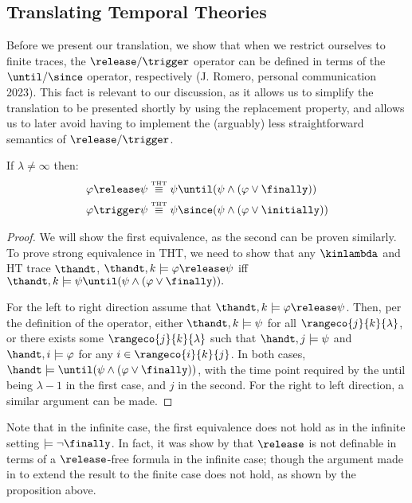 \subsection{Translating Temporal Theories}

Before we present our translation, we show that when we restrict
ourselves to finite traces, the $\release/\trigger$ operator can be
defined in terms of the $\until/\since$ operator, respectively
(J. Romero, personal communication 2023). This fact is relevant to our
discussion, as it allows us to simplify the translation to be
presented shortly by using the replacement property, and allows us to
later avoid having to implement the (arguably) less straightforward
semantics of $\release/\trigger$.

\begin{proposition}

If $\lambda \neq \infty$ then:
\begin{align*}
\varphi \release \psi &\equivtht \psi \until (\psi \wedge (\varphi \vee \finally)) \\
\varphi \trigger \psi &\equivtht \psi \since (\psi \wedge (\varphi \vee \initially))
\end{align*}
\end{proposition}
\begin{proof}
  We will show the first equivalence, as the second can be proven
  similarly. To prove strong equivalence in THT, we need to show that
  any $\kinlambda$ and HT trace $\thandt$,
  $\thandt,k \models \varphi \release \psi$ iff
  $\thandt,k \models \psi \until (\psi \wedge (\varphi \vee
  \finally)).$

  For the left to right direction assume that
  $\thandt,k \models \varphi \release \psi$. Then, per the definition
  of the operator, either $\thandt,k \models \psi$ for all
  $\rangeco{j}{k}{\lambda}$, or there exists some
  $\rangeco{j}{k}{\lambda}$ such that $\handt,j \models \psi$ and
  $\handt,i \models \varphi$ for any $i \in \rangeco{i}{k}{j}$. In
  both cases,
  $\handt \models \until (\psi \wedge (\varphi \vee \finally))$, with
  the time point required by the until being $\lambda-1$ in the first
  case, and $j$ in the second. For the right to left direction, a
  similar argument can be made.
\end{proof}

Note that in the infinite case, the first equivalence does not hold as
in the infinite setting $\models \neg \finally$. In fact, it was show
by \cite{babodife20a} that $\release$ is not definable in terms of a
$\release$-free formula in the infinite case; though the argument
made in \cite[p. 20]{agcadipescscvi20a} to extend the result to the
finite case does not hold, as shown by the proposition above.

